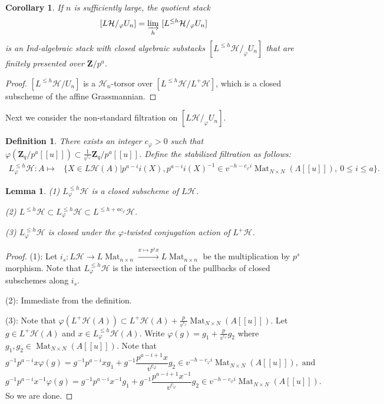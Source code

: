 \documentclass[11pt]{amsart}
\newtheorem{lem}{Lemma}
\newtheorem{cor}{Corollary}
\newtheorem{dfn}{Definition}
\numberwithin{thm}{section}
\numberwithin{lem}{section}
\numberwithin{cor}{section}
\numberwithin{prop}{section}
\numberwithin{exam}{section}
\numberwithin{dfn}{section}
\newcommand{\dirlim}[1]{{\varinjlim_{#1}}}
\newcommand{\clH}{\mathcal{H}}
\newcommand{\Z}{\mathbf{Z}}
\begin{document}
\begin{cor}
\label{cor:PR0}
If $n$ is sufficiently large, the quotient stack
$$
[L\clH/_\varphi U_n] = \dirlim{h}~[L^{\le h}\clH/_\varphi U_n]
$$
is an Ind-algebraic stack with closed
algebraic substacks $[L^{\le h}\clH/_\varphi U_n]$
that are finitely presented over $\Z/p^a$.
\end{cor}

\begin{proof}
$[L^{\le h}\clH/ U_n]$
is a $\clH_n$-torsor over
$[L^{\le h}\clH/ L^+\clH]$,
which is a closed subscheme of the affine Grassmannian.
\end{proof}

Next we consider the non-standard filtration on $[L\clH/_\varphi U_n]$.

\begin{dfn}
\label{def:frob-stab-LmG}
There exists an integer $c_\varphi > 0$
such that
$\varphi(\Z_q/p^a[\![u]\!])\subset
\frac{1}{v^{c_\varphi}}\Z_q/p^a[\![u]\!]$.
Define the stabilized filtration as follows:
\begin{align*}
L^{\le h}_\varphi\clH: A\mapsto &\{X\in L\clH(A)|p^{a-i} i(X), p^{a-i} i(X)^{-1}\in v^{-h - c_\varphi i}\operatorname{Mat}_{N\times N}(\Lambda[\![u]\!]),~ 0\le i\le a\}.
\end{align*}
\end{dfn}

\begin{lem}
\label{lem:pl-1}
(1)
$L^{\le h}_\varphi\clH$ is a closed subscheme of $L\clH$.

(2)
$L^{\le h}\clH\subset L^{\le h}_\varphi\clH \subset L^{\le h+ a c_\varphi}\clH$.

(3)
$L^{\le h}_\varphi\clH$ is closed under the $\varphi$-twisted
conjugation action of $L^+\clH$.
\end{lem}


\begin{proof}
(1):
Let $i_s:L\clH \to L \operatorname{Mat}_{n\times n}
\xrightarrow{x \mapsto p^s x} L \operatorname{Mat}_{n\times n}$
be the multiplication by $p^s$ morphism.
Note that
$L^{\le h}_\varphi\clH$ is the intersection
of the pullbacks of
closed subschemes
along $i_s$.

(2):
Immediate from the definition.

(3): Note that $\varphi(L^+\clH(A))\subset L^+\clH(A) 
+ \frac{p}{v^{c_\varphi}}\operatorname{Mat}_{N\times N}(A[\![u]\!])$.
Let $g\in L^+\clH(A)$
and $x\in L^{\le h}_\varphi\clH(A)$.
Write $\varphi(g)=g_1 + \frac{p}{v^{c_\varphi}}g_2$
where $g_1, g_2\in \operatorname{Mat}_{N\times N}(A[\![u]\!])$.
Note that
$$
g^{-1} p^{a-i} x \varphi(g)
=g^{-1} p^{a-i} x g_1 + g^{-1} \frac{p^{a-i+1} x}{v^{c_\varphi}} g_2
\in v^{-h - c_\varphi i}\operatorname{Mat}_{N\times N}(A[\![u]\!]),
\text{~and}
$$
$$
g^{-1} p^{a-i} x^{-1} \varphi(g)
=g^{-1} p^{a-i} x^{-1} g_1 + g^{-1} \frac{p^{a-i+1} x^{-1}}{v^{c_\varphi}} g_2
\in v^{-h - c_\varphi i}\operatorname{Mat}_{N\times N}(A[\![u]\!]).
$$
So we are done.
\end{proof}
\end{document}

